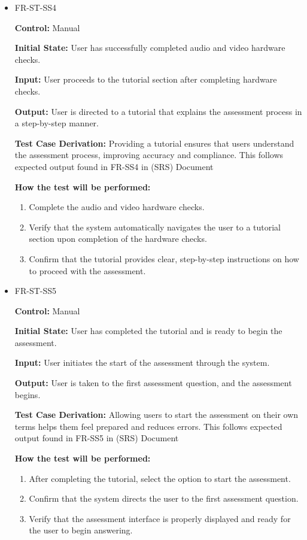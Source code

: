 \documentclass[12pt, titlepage]{article}
\begin{document}
\begin{itemize}
  \item FR-ST-SS4
    \begin{mdframed}[linewidth=0.5mm]
      \textbf{Control:} Manual \par
      \textbf{Initial State:} User has successfully completed audio and video hardware checks. \par
      \textbf{Input:} User proceeds to the tutorial section after completing hardware checks. \par
      \textbf{Output:} User is directed to a tutorial that explains the assessment process in a step-by-step manner. \par
      \textbf{Test Case Derivation:} Providing a tutorial ensures that users understand the assessment process,
       improving accuracy and compliance. This follows expected output found in FR-SS4 in (SRS) Document \par
      \textbf{How the test will be performed:}
      \begin{enumerate}[noitemsep]
        \item Complete the audio and video hardware checks.
        \item Verify that the system automatically navigates the user to a tutorial section upon completion of the hardware checks.
        \item Confirm that the tutorial provides clear, step-by-step instructions on how to proceed with the assessment.
      \end{enumerate}
    \end{mdframed}

  \item FR-ST-SS5
    \begin{mdframed}[linewidth=0.5mm]
      \textbf{Control:} Manual \par
      \textbf{Initial State:} User has completed the tutorial and is ready to begin the assessment. \par
      \textbf{Input:} User initiates the start of the assessment through the system. \par
      \textbf{Output:} User is taken to the first assessment question, and the assessment begins. \par
      \textbf{Test Case Derivation:} Allowing users to start the assessment on their own terms helps them feel prepared and reduces errors. 
      This follows expected output found in FR-SS5 in (SRS) Document\par
      \textbf{How the test will be performed:}
      \begin{enumerate}[noitemsep]
        \item After completing the tutorial, select the option to start the assessment.
        \item Confirm that the system directs the user to the first assessment question.
        \item Verify that the assessment interface is properly displayed and ready for the user to begin answering.
      \end{enumerate}
    \end{mdframed}

\end{itemize}
\end{document}
